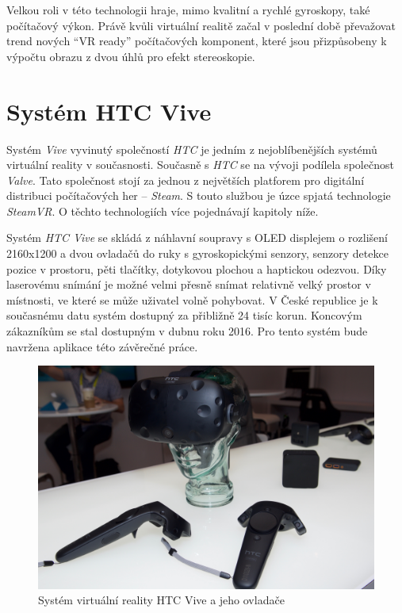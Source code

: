 Velkou roli v této technologii hraje, mimo kvalitní a rychlé gyroskopy,
také počítačový výkon. Právě kvůli virtuální realitě začal v poslední
době převažovat trend nových ``VR ready'' počítačových komponent, které jsou
přizpůsobeny k výpočtu obrazu z dvou úhlů pro efekt stereoskopie. \autocite{vrtech}

\section{Systém HTC Vive}\label{systuxe9m-htc-vive}

Systém \emph{Vive} vyvinutý společností \emph{HTC} je jedním z
nejoblíbenějších systémů virtuální reality v současnosti. \autocite{vivepopular} Současně s
\emph{HTC} se na vývoji podílela společnost \emph{Valve}. Tato
společnost stojí za jednou z největších platforem pro digitální
distribuci počítačových her -- \emph{Steam}. S touto službou je úzce
spjatá technologie \emph{SteamVR}. O těchto technologiích více
pojednávají kapitoly níže.

Systém \emph{HTC Vive} se skládá z náhlavní soupravy s OLED displejem o
rozlišení 2160x1200 a dvou ovladačů do ruky s gyroskopickými senzory,
senzory detekce pozice v prostoru, pěti tlačítky, dotykovou plochou a
haptickou odezvou. \autocite{vivespec} Díky laserovému snímání je možné velmi přesně snímat
relativně velký prostor v místnosti, ve které se může uživatel volně
pohybovat. V České republice je k současnému datu systém dostupný za
přibližně 24 tisíc korun. \autocite{viveprice} Koncovým zákazníkům se stal dostupným v dubnu
roku 2016. Pro tento systém bude navržena aplikace této závěrečné práce.

\begin{figure}[h!]
\centering
\includegraphics[width=12cm]{src/assets/vive-pre.jpeg}
\caption{Systém virtuální reality HTC Vive a jeho ovladače\autocite{htcvivepre}}
\end{figure}

